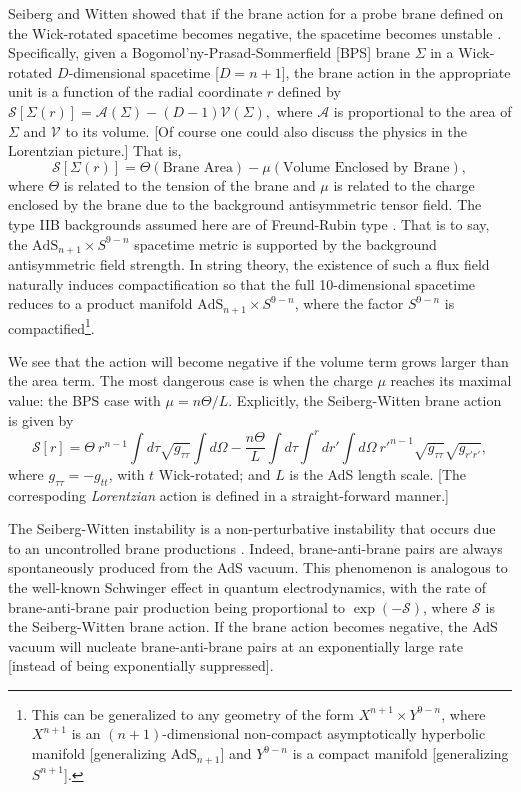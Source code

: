 \documentclass[12pt]{article}
\newcommand{\2}{$^2$}
\newcommand{\3}{$^3$}
\newcommand{\4}{$_4$}
\newcommand{\5}{$_5$}
\begin{document}
Seiberg and Witten showed that if the brane action for a probe brane defined on the Wick-rotated spacetime becomes negative, the spacetime becomes unstable \cite{kn:seiberg, KPR, Barbon, 1411.1887}. 
Specifically, given a Bogomol'ny-Prasad-Sommerfield [BPS] brane $\Sigma$ in a Wick-rotated $D$-dimensional spacetime [$D=n+1$], the brane action in the appropriate unit is a function of the radial coordinate $r$ defined by
$
\mathcal{S}[\Sigma(r)] = \mathcal{A}(\Sigma) - (D-1)\mathcal{V}(\Sigma),
$
where $\mathcal{A}$ is proportional to the area of $\Sigma$ and $\mathcal{V}$ to its volume. [Of course one could also discuss the physics in the Lorentzian picture.]
That is,
\begin{equation}\label{SWaction}
\mathcal{S}[\Sigma(r)]=\Theta (\text{Brane Area}) - \mu (\text{Volume Enclosed by Brane}),
\end{equation}
where $\Theta$ is related to the tension of the brane and $\mu$ is related to the charge enclosed by the brane due to the background antisymmetric tensor field. The type IIB backgrounds
assumed here are of Freund-Rubin type \cite{FR}. That is to say, the $\text{AdS}_{n+1} \times S^{9-n}$ spacetime metric is supported by the background antisymmetric field strength. In string theory, the existence of such a flux field naturally induces compactification so that the full 10-dimensional spacetime reduces to a product manifold $\text{AdS}_{n+1} \times S^{9-n}$, where the factor $S^{9-n}$ is compactified\footnote{This can be generalized to any geometry of the form $X^{n+1} \times Y^{9-n}$, where $X^{n+1}$ is an $(n+1)$-dimensional non-compact asymptotically hyperbolic manifold [generalizing $\text{AdS}_{n+1}$] and $Y^{9-n}$ is a compact manifold [generalizing $S^{n+1}$].}.   

We see that the action will become negative if the volume term grows larger than the area term. The most dangerous case is when the charge $\mu$ reaches its maximal value: the BPS case with $\mu=n\Theta/L$. Explicitly, the Seiberg-Witten brane action is given by
\begin{equation}
\mathcal{S}[r]= \Theta ~r^{n-1} \int d\tau \sqrt{g_{\tau\tau}} \int d\Omega  - 
\frac{n\Theta}{L} \int d\tau \int^r dr' \int d\Omega ~r'^{n-1}\sqrt{g_{\tau \tau}}\sqrt{g_{r'r'}},
\end{equation} 
where $g_{\tau\tau}=-g_{tt}$, with $t$ Wick-rotated; and $L$ is the AdS length scale.
[The correspoding \emph{Lorentzian} action is defined in a straight-forward manner.]

The Seiberg-Witten instability is a non-perturbative instability that occurs due to an uncontrolled brane productions \cite{kn:seiberg, KPR}. Indeed, brane-anti-brane pairs are always spontaneously produced from the AdS vacuum. This phenomenon is analogous to the well-known Schwinger effect in quantum electrodynamics, with the rate of brane-anti-brane pair production being proportional to $\exp(-\mathcal{S})$, where $\mathcal{S}$ is the Seiberg-Witten brane action. If the brane action becomes negative, the AdS vacuum will nucleate brane-anti-brane pairs at an exponentially large rate [instead of being exponentially suppressed].  
\end{document}
